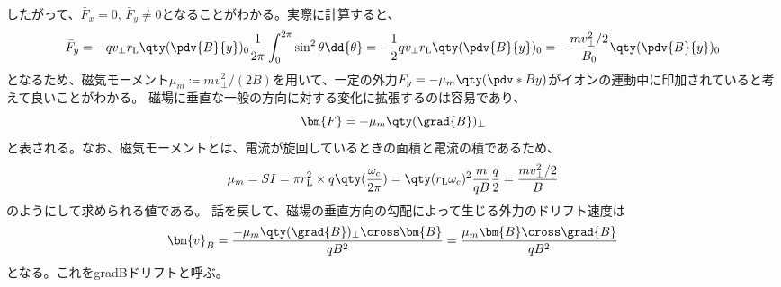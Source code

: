 したがって、$\bar{F}_x = 0,\,\bar{F}_y \neq 0$となることがわかる。実際に計算すると、
\begin{equation}
	\bar{F}_y = -qv_{\perp}r_{\text{L}}\qty(\pdv{B}{y})_0\frac{1}{2\pi}\int_0^{2\pi}\sin^2\theta\dd{\theta}
	= -\frac{1}{2}qv_{\perp}r_{\text{L}}\qty(\pdv{B}{y})_0 = -\frac{mv^2_{\perp}/2}{B_0}\qty(\pdv{B}{y})_0
\end{equation}
となるため、磁気モーメント$\mu_m \coloneqq mv^2_{\perp}/(2B)$を用いて、一定の外力$F_y = -\mu_m\qty(\pdv*{B}{y})$がイオンの運動中に印加されていると考えて良いことがわかる。
磁場に垂直な一般の方向に対する変化に拡張するのは容易であり、
\begin{equation}
	\bm{F} = -\mu_m\qty(\grad{B})_{\perp}
\end{equation}
と表される。なお、磁気モーメントとは、電流が旋回しているときの面積と電流の積であるため、
\begin{equation}
	\mu_m = SI = \pi r_{\text{L}}^2\times q\qty(\frac{\omega_c}{2\pi}) = \qty(r_{\text{L}}\omega_c)^2\frac{m}{qB}\frac{q}{2} = \frac{mv_{\perp}^2/2}{B}
\end{equation}
のようにして求められる値である。
話を戻して、磁場の垂直方向の勾配によって生じる外力のドリフト速度は
\begin{equation}
	\bm{v}_{B} = \frac{-\mu_m\qty(\grad{B})_{\perp}\cross\bm{B}}{qB^2} = \frac{\mu_m\bm{B}\cross\grad{B}}{qB^2}
\end{equation}
となる。これをgradBドリフトと呼ぶ。
